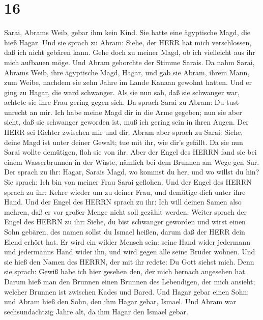 \hypertarget{section-15}{%
\section{16}\label{section-15}}

 Sarai, Abrams Weib, gebar ihm kein Kind. Sie hatte eine
ägyptische Magd, die hieß Hagar.  Und sie sprach zu Abram:
Siehe, der HERR hat mich verschlossen, daß ich nicht gebären kann. Gehe
doch zu meiner Magd, ob ich vielleicht aus ihr mich aufbauen möge. Und
Abram gehorchte der Stimme Sarais.  Da nahm Sarai, Abrams
Weib, ihre ägyptische Magd, Hagar, und gab sie Abram, ihrem Mann, zum
Weibe, nachdem sie zehn Jahre im Lande Kanaan gewohnt hatten.
 Und er ging zu Hagar, die ward schwanger. Als sie nun sah,
daß sie schwanger war, achtete sie ihre Frau gering gegen sich.
 Da sprach Sarai zu Abram: Du tust unrecht an mir. Ich habe
meine Magd dir in die Arme gegeben; nun sie aber sieht, daß sie
schwanger geworden ist, muß ich gering sein in ihren Augen. Der HERR sei
Richter zwischen mir und dir.  Abram aber sprach zu Sarai:
Siehe, deine Magd ist unter deiner Gewalt; tue mit ihr, wie dir's
gefällt. Da sie nun Sarai wollte demütigen, floh sie von ihr.
 Aber der Engel des HERRN fand sie bei einem Wasserbrunnen
in der Wüste, nämlich bei dem Brunnen am Wege gen Sur.  Der
sprach zu ihr: Hagar, Sarais Magd, wo kommst du her, und wo willst du
hin? Sie sprach: Ich bin von meiner Frau Sarai geflohen. 
Und der Engel des HERRN sprach zu ihr: Kehre wieder um zu deiner Frau,
und demütige dich unter ihre Hand.  Und der Engel des HERRN
sprach zu ihr: Ich will deinen Samen also mehren, daß er vor großer
Menge nicht soll gezählt werden.  Weiter sprach der Engel
des HERRN zu ihr: Siehe, du bist schwanger geworden und wirst einen Sohn
gebären, des namen sollst du Ismael heißen, darum daß der HERR dein
Elend erhört hat.  Er wird ein wilder Mensch sein: seine
Hand wider jedermann und jedermanns Hand wider ihn, und wird gegen alle
seine Brüder wohnen.  Und sie hieß den Namen des HERRN, der
mit ihr redete: Du Gott siehst mich. Denn sie sprach: Gewiß habe ich
hier gesehen den, der mich hernach angesehen hat.  Darum
hieß man den Brunnen einen Brunnen des Lebendigen, der mich ansieht;
welcher Brunnen ist zwischen Kades und Bared.  Und Hagar
gebar einen Sohn; und Abram hieß den Sohn, den ihm Hagar gebar, Ismael.
 Und Abram war sechsundachtzig Jahre alt, da ihm Hagar den
Ismael gebar.

